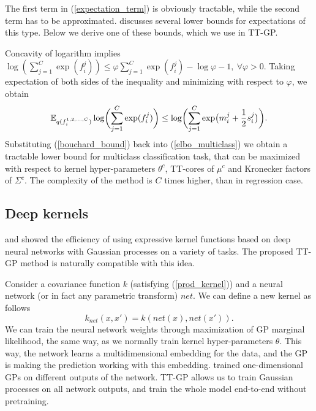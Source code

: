   The first term in (\ref{expectation_term}) is obviously tractable, while the
  second term has to be approximated. \citet{bouchard2007} discusses several
  lower bounds for expectations of this type. Below we derive one of these bounds,
  which we use in TT-GP.

  Concavity of logarithm implies $\log(\sum_{j=1}^{C} \exp(f_i^j)) \le \varphi \sum_{j=1}^C \exp(f_i^j) - \log \varphi - 1,\ \forall\varphi > 0$. Taking expectation of both sides of the inequality and minimizing with respect
  to $\varphi$, we obtain
  \begin{equation}
  \label{bouchard_bound}
    \mathbb{E}_{q(f_i^{1, 2, \ldots, C})} \log\biggl(\sum_{j=1}^C \exp(f_i^j)\biggr) \le
    \log \biggl(\sum_{j=1}^C \exp\bigl(m_i^j + \frac 1 2 s_i^j\bigr) \biggr).
  \end{equation}
  Substituting (\ref{bouchard_bound}) back into (\ref{elbo_multiclass}) we obtain
  a tractable lower bound for multiclass classification task, that can be
  maximized with respect to kernel hyper-parameters $\theta^c$, TT-cores of
  $\mu^c$ and Kronecker factors of $\Sigma^c$. The complexity of the method
  is $C$ times higher, than in regression case.

\subsection{Deep kernels}

  \citet{wilson2016stochastic} and \citet{wilson2016deep} showed the efficiency
  of using expressive kernel functions based on deep neural networks with
  Gaussian processes on a variety of tasks. The proposed TT-GP method is
  naturally compatible with this idea.

  Consider a covariance function $k$ (satisfying (\ref{prod_kernel})) and
  a neural network (or in fact any parametric transform) $net$. We can define a
  new kernel as follows
  \[
    k_{net}(x, x') = k(net(x), net(x')).
  \]
  We can train the neural network weights through maximization of GP marginal
  likelihood, the same way, as we normally train kernel hyper-parameters $\theta$.
  This way, the network learns a multidimensional embedding for the data, and
  the GP is making the prediction working with this embedding.
  \citet{wilson2016stochastic} trained one-dimensional GPs on different outputs
  of the network. TT-GP allows us to train Gaussian processes on all network
  outputs, and train the whole model end-to-end without pretraining.
